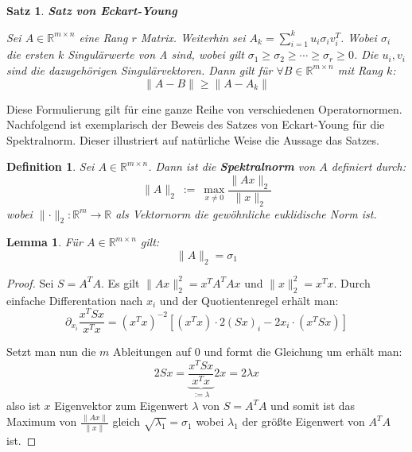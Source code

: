 \documentclass{article}
\newcommand{\R}[0]{\mathbb{R}}
\newtheorem{defin}{Definition}
\newtheorem{lemma}{Lemma}
\newtheorem{thm}{Satz}
\begin{document}
\begin{thm} \textbf{Satz von Eckart-Young}
    
    Sei $A \in \R^{m\times n}$ eine Rang $r$ Matrix. Weiterhin sei $A_k = \sum\limits_{i=1}^k u_i\sigma_iv_i^T$. 
    Wobei $\sigma_i$ die ersten $k$ Singulärwerte von A sind, wobei gilt $\sigma_1 \geq \sigma_2 \geq \cdots \geq \sigma_r \geq 0$. Die $u_i, v_i$ sind die dazugehörigen Singulärvektoren. 
    Dann gilt für $\forall B \in \R^{m \times n}$ mit Rang $k$:
    \begin{equation}
        \lVert A - B \rVert \geq \lVert A - A_k \rVert
    \end{equation}
\end{thm}

Diese Formulierung gilt für eine ganze Reihe von verschiedenen Operatornormen.
Nachfolgend ist exemplarisch der Beweis des Satzes von Eckart-Young für die Spektralnorm.
Dieser illustriert auf natürliche Weise die Aussage das Satzes.

\begin{defin}
    Sei $A \in \R^{m \times n}$. Dann ist die \textbf{Spektralnorm} von $A$ definiert durch:
    \begin{equation}
        \lVert A \rVert_2 \: := \: \max\limits_{x \neq 0} \frac{\lVert Ax \rVert_2}{\lVert x \rVert_2}
    \end{equation}
    wobei $\lVert \cdot \rVert_2: \R^m \to \R$ als Vektornorm die gewöhnliche euklidische Norm ist.
\end{defin}

\begin{lemma}
    Für $A \in \R^{m \times n}$ gilt:
    \begin{equation}
        \lVert A \rVert_2 = \sigma_1
    \end{equation}
\end{lemma}

\begin{proof}
    Sei $S = A^TA$. Es gilt $\lVert Ax \rVert_2^2 = x^TA^TAx$ und $\lVert x \rVert_2^2 = x^Tx$.
    Durch einfache Differentation nach $x_i$ und der Quotientenregel erhält man:
    \begin{equation}
        \partial_{x_i}\frac{x^TSx}{x^Tx} = (x^Tx)^{-2}\left[ (x^Tx) \cdot 2(Sx)_i - 2x_i \cdot (x^TSx) \right]
    \end{equation}

    Setzt man nun die $m$ Ableitungen auf $0$ und formt die Gleichung um erhält man:
    \begin{equation}
        2Sx = \underbrace{\frac{x^TSx}{x^Tx}}_{:= \lambda} 2x = 2\lambda x
    \end{equation}
    also ist $x$ Eigenvektor zum Eigenwert $\lambda$ von $S = A^TA$ und
    somit ist das Maximum von $\frac{\lVert Ax \rVert}{\lVert x \rVert}$ gleich $\sqrt{\lambda_1} = \sigma_1$ wobei $\lambda_1$ der größte Eigenwert von $A^TA$ ist.
\end{proof}
\end{document}

